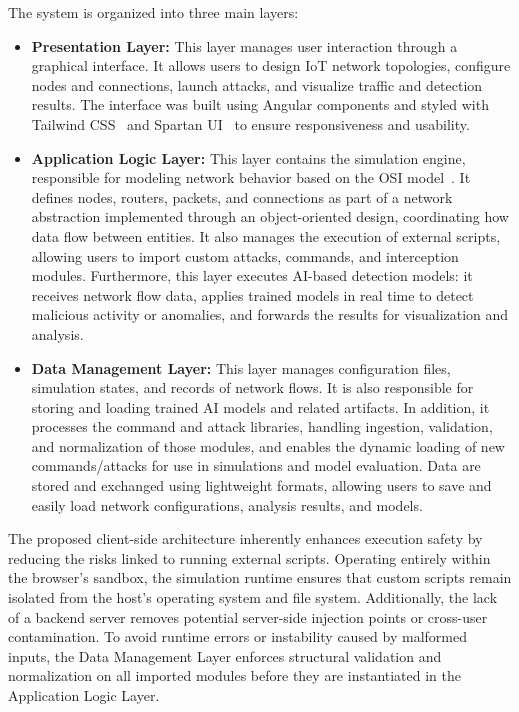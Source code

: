 The system is organized into three main layers:
\begin{itemize}
    \item \textbf{Presentation Layer:} This layer manages user interaction through a graphical interface. It allows users to design IoT network topologies, configure nodes and connections, launch attacks, and visualize traffic and detection results. The interface was built using Angular components and styled with Tailwind CSS~\cite{tailwind} and Spartan UI~\cite{spartan} to ensure responsiveness and usability.
    \item \textbf{Application Logic Layer:} This layer contains the simulation engine, responsible for modeling network behavior based on the OSI model~\cite{osi}. It defines nodes, routers, packets, and connections as part of a network abstraction implemented through an object-oriented design, coordinating how data flow between entities. It also manages the execution of external scripts, allowing users to import custom attacks, commands, and interception modules. Furthermore, this layer executes AI-based detection models: it receives network flow data, applies trained models in real time to detect malicious activity or anomalies, and forwards the results for visualization and analysis.
    \newline
    \item \textbf{Data Management Layer:} This layer manages configuration files, simulation states, and records of network flows. It is also responsible for storing and loading trained AI models and related artifacts. In addition, it processes the command and attack libraries, handling ingestion, validation, and normalization of those modules, and enables the dynamic loading of new commands/attacks for use in simulations and model evaluation. Data are stored and exchanged using lightweight formats, allowing users to save and easily load network configurations, analysis results, and models.
\end{itemize}

The proposed client-side architecture inherently enhances execution safety by reducing the risks linked to running external scripts. Operating entirely within the browser's sandbox, the simulation runtime ensures that custom scripts remain isolated from the host's operating system and file system. Additionally, the lack of a backend server removes potential server-side injection points or cross-user contamination. To avoid runtime errors or instability caused by malformed inputs, the Data Management Layer enforces structural validation and normalization on all imported modules before they are instantiated in the Application Logic Layer.

